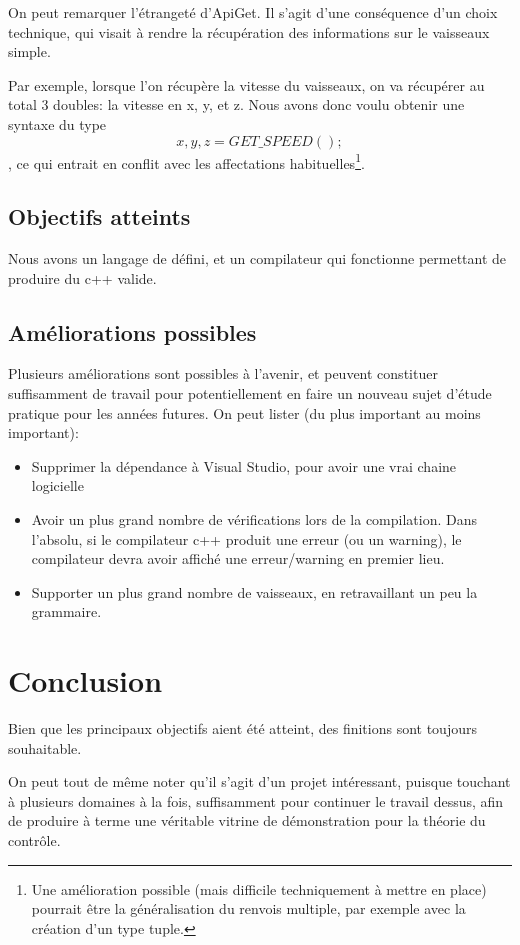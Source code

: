 \documentclass[a4paper,11pt]{article}
\begin{document}
        On peut remarquer l'étrangeté d'ApiGet. Il s'agit d'une conséquence d'un choix technique, qui visait à rendre la récupération des informations sur le vaisseaux simple. 
        
        Par exemple, lorsque l'on récupère la vitesse du vaisseaux, on va récupérer au total 3 doubles: la vitesse en x, y, et z. Nous avons donc voulu obtenir une syntaxe du type \[ x,y,z = GET\_SPEED(); \], ce qui entrait en conflit avec les affectations habituelles\footnote{Une amélioration possible (mais difficile techniquement à mettre en place) pourrait être la généralisation du renvois multiple, par exemple avec la création d'un type tuple.}.



    \subsection{Objectifs atteints}
        Nous avons un langage de défini, et un compilateur qui fonctionne permettant de produire du c++ valide.

    \subsection{Améliorations possibles}
        Plusieurs améliorations sont possibles à l'avenir, et peuvent constituer suffisamment de travail pour potentiellement en faire un nouveau sujet d'étude pratique pour les années futures.
        On peut lister (du plus important au moins important):
        \begin{itemize}
            \item Supprimer la dépendance à Visual Studio, pour avoir une vrai chaine logicielle
            \item Avoir un plus grand nombre de vérifications lors de la compilation. Dans l'absolu, si le compilateur c++ produit une erreur (ou un warning), le compilateur devra avoir affiché une erreur/warning en premier lieu.
            \item Supporter un plus grand nombre de vaisseaux, en retravaillant un peu la grammaire.
        \end{itemize}

\section{Conclusion}
    Bien que les principaux objectifs aient été atteint, des finitions sont toujours souhaitable.

    On peut tout de même noter qu'il s'agit d'un projet intéressant, puisque touchant à plusieurs domaines à la fois, suffisamment pour continuer le travail dessus, afin de produire à terme une véritable vitrine de démonstration pour la théorie du contrôle.


\end{document}
